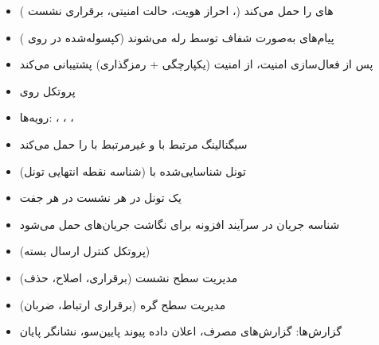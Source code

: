 

\begin{itemize}
\tightlist
\item
  های  را حمل می‌کند (، احراز هویت، حالت امنیتی، برقراری نشست )
\item
  پیام‌های  به‌صورت شفاف توسط  رله می‌شوند (کپسوله‌شده در  روی )
\item
  پس از فعال‌سازی امنیت، از امنیت  (یکپارچگی + رمزگذاری) پشتیبانی می‌کند
\end{itemize}


\begin{itemize}
\tightlist
\item
  پروتکل  روی 
\item
  رویه‌ها: ، ، ، 
\item
  سیگنالینگ مرتبط با  و غیرمرتبط با  را حمل می‌کند
\end{itemize}


\begin{itemize}
\tightlist
\item
  تونل  شناسایی‌شده با  (شناسه نقطه انتهایی تونل)
\item
  یک تونل  در هر نشست  در هر جفت 
\item
  شناسه جریان  در سرآیند افزونه  برای نگاشت جریان‌های  حمل می‌شود
\end{itemize}


\begin{itemize}
\tightlist
\item
   (پروتکل کنترل ارسال بسته)  
\item
  مدیریت سطح نشست (برقراری، اصلاح، حذف)
\item
  مدیریت سطح گره (برقراری ارتباط، ضربان)
\item
  گزارش‌ها: گزارش‌های مصرف، اعلان داده پیوند پایین‌سو، نشانگر پایان
\end{itemize}

